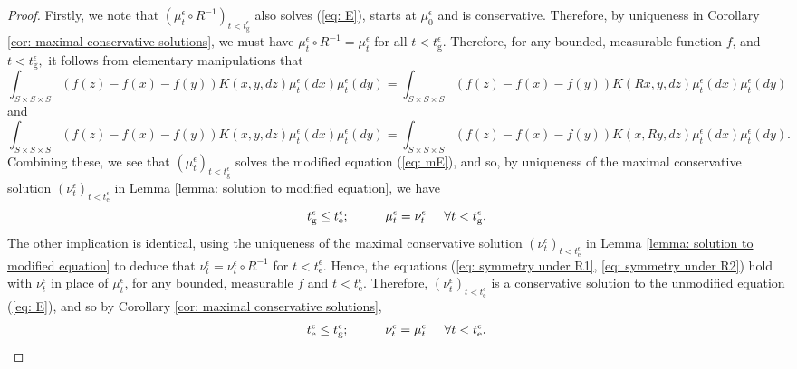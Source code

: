 \documentclass[11pt, notitlepage]{article}
\begin{document}
\begin{proof} Firstly, we note that $( \mu^\epsilon_t \circ R^{-1})_{t<t_\mathrm{g}^\epsilon}$ also solves (\ref{eq: E}), starts at $\mu^\epsilon_0$ and is conservative. Therefore, by uniqueness in Corollary \ref{cor: maximal conservative solutions}, we must have $\mu^\epsilon_t \circ R^{-1}=\mu^\epsilon_t$ for all $t<t_\mathrm{g}^\epsilon.$ Therefore, for any bounded, measurable function $f$, and $t<t^\epsilon_\mathrm{g},$ it follows from elementary manipulations that \begin{equation}\label{eq: symmetry under R1}
        \int_{S\times S\times S} (f(z)-f(x)-f(y))K(x,y,dz)\mu^\epsilon_t(dx)\mu^\epsilon_t(dy) =  \int_{S\times S\times S} (f(z)-f(x)-f(y))K(Rx,y,dz)\mu^\epsilon_t(dx)\mu^\epsilon_t(dy)
    \end{equation} and
\begin{equation}\label{eq: symmetry under R2}
        \int_{S\times S\times S} (f(z)-f(x)-f(y))K(x,y,dz)\mu^\epsilon_t(dx)\mu^\epsilon_t(dy) =  \int_{S\times S\times S} (f(z)-f(x)-f(y))K(x,Ry,dz)\mu^\epsilon_t(dx)\mu^\epsilon_t(dy).
    \end{equation} Combining these, we see that $(\mu^\epsilon_t)_{t<t^\epsilon_\mathrm{g}}$ solves the modified equation (\ref{eq: mE}), and so, by uniqueness of the maximal conservative solution $(\nu^\epsilon_t)_{t<t_\mathrm{e}^\epsilon}$ in Lemma \ref{lemma: solution to modified equation}, we have \begin{equation}
        t^\epsilon_\mathrm{g} \leq t_\mathrm{e}^\epsilon; \hspace{1cm} \mu^\epsilon_t=\nu^\epsilon_t \hspace{0.5cm}\forall t<t^\epsilon_\mathrm{g}.
    \end{equation} The other implication is identical, using the uniqueness of the maximal conservative solution $(\nu^\epsilon_t)_{t<t_\mathrm{e}^\epsilon}$ in Lemma \ref{lemma: solution to modified equation} to deduce that $\nu^\epsilon_t= \nu^\epsilon_t\circ R^{-1}$ for $t<t_\mathrm{e}^\epsilon$. Hence, the equations (\ref{eq: symmetry under R1}, \ref{eq: symmetry under R2}) hold with $\nu^\epsilon_t$ in place of $\mu^\epsilon_t$, for any bounded, measurable $f$ and $t<t_\mathrm{e}^\epsilon.$ Therefore, $(\nu^\epsilon_t)_{t<t_\mathrm{e}^\epsilon}$ is a conservative solution to the unmodified equation (\ref{eq: E}), and so by Corollary \ref{cor: maximal conservative solutions}, \begin{equation}
        t_\mathrm{e}^\epsilon \leq t^\epsilon_\mathrm{g}; \hspace{1cm} \nu^\epsilon_t=\mu^\epsilon_t \hspace{0.5cm}\forall t<t_\mathrm{e}^\epsilon.
    \end{equation} \end{proof}  
\end{document}
